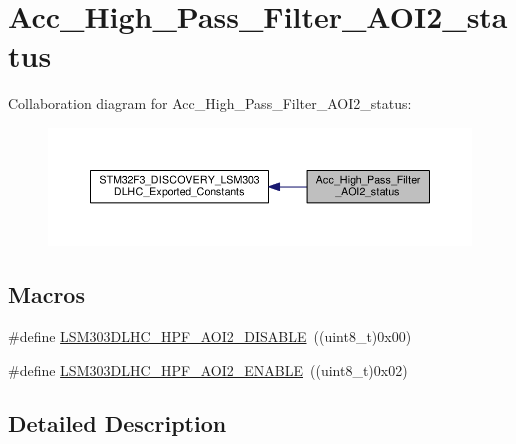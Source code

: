 \hypertarget{group__Acc__High__Pass__Filter__AOI2__status}{\section{Acc\+\_\+\+High\+\_\+\+Pass\+\_\+\+Filter\+\_\+\+A\+O\+I2\+\_\+status}
\label{group__Acc__High__Pass__Filter__AOI2__status}
}
Collaboration diagram for Acc\+\_\+\+High\+\_\+\+Pass\+\_\+\+Filter\+\_\+\+A\+O\+I2\+\_\+status\+:\nopagebreak
\begin{figure}[H]
\begin{center}
\leavevmode
\includegraphics[width=350pt]{group__Acc__High__Pass__Filter__AOI2__status}
\end{center}
\end{figure}
\subsection*{Macros}
\begin{DoxyCompactItemize}
\item 
\#define \hyperlink{group__Acc__High__Pass__Filter__AOI2__status_ga585078bebcfd43f09575cd037b63aa47}{L\+S\+M303\+D\+L\+H\+C\+\_\+\+H\+P\+F\+\_\+\+A\+O\+I2\+\_\+\+D\+I\+S\+A\+B\+L\+E}~((uint8\+\_\+t)0x00)
\item 
\#define \hyperlink{group__Acc__High__Pass__Filter__AOI2__status_ga8f9df95d3cd9c9f1bf05405e668957e4}{L\+S\+M303\+D\+L\+H\+C\+\_\+\+H\+P\+F\+\_\+\+A\+O\+I2\+\_\+\+E\+N\+A\+B\+L\+E}~((uint8\+\_\+t)0x02)
\end{DoxyCompactItemize}


\subsection{Detailed Description}


